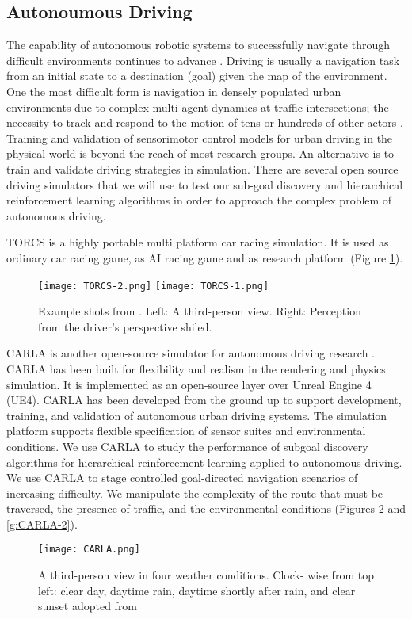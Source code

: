 \documentclass[letterpaper,titlepage]{article}
\begin{document}
\subsection{Autonoumous Driving}
The capability of autonomous robotic systems to successfully navigate through difficult environments continues to advance \citep{Autonomous:Silver:2010,Deep-Car-2017,CARLA:2017}.
Driving is usually a navigation task from an initial state to a destination (goal) given the map of the environment. One the most difficult form is navigation in densely populated urban environments due to complex multi-agent dynamics at traffic intersections; the necessity to track and respond to the motion of tens or hundreds of other actors \citep{CARLA:2017}. Training and validation of sensorimotor control models for urban driving in the physical world is beyond the reach of most research groups.
An alternative is to train and validate driving strategies in simulation. There are several open source driving simulators that we will use to test our sub-goal discovery and hierarchical reinforcement learning algorithms in order to approach the complex problem of autonomous driving.

TORCS is a highly portable multi platform car racing simulation. It is used as ordinary car racing game, as AI racing game and as research platform \citep{TORCS} (Figure \ref{g:TORCS}).
\begin{figure}[H]
\centering
\texttt{[image: TORCS-2.png]}
\texttt{[image: TORCS-1.png]}
\caption{Example shots from \citep{TORCS}. Left: A third-person view. Right: Perception from the driver's perspective shiled.}
\label{g:TORCS}
\end{figure}


CARLA is another open-source simulator for autonomous driving research \citep{CARLA:2017}. CARLA has been built for flexibility and realism in the rendering and physics simulation. It is implemented as an open-source layer over Unreal Engine 4 (UE4). CARLA has been developed from the ground up to support development, training, and validation of autonomous urban driving systems. The simulation platform supports flexible specification of sensor suites and environmental conditions. We use CARLA to study the performance of subgoal discovery algorithms for hierarchical reinforcement learning applied to autonomous driving. We use CARLA to stage controlled goal-directed navigation scenarios of increasing difficulty. We manipulate the complexity of the route that must be traversed, the presence of traffic, and the environmental conditions (Figures \ref{g:CARLA} and \ref{g:CARLA-2}). 
\begin{figure}[H]
\centering
\texttt{[image: CARLA.png]}
\caption{A third-person view in four weather conditions. Clock- wise from top left: clear day, daytime rain, daytime shortly after rain, and clear sunset adopted from \citep{CARLA:2017}}
\label{g:CARLA}
\end{figure}
\end{document}
